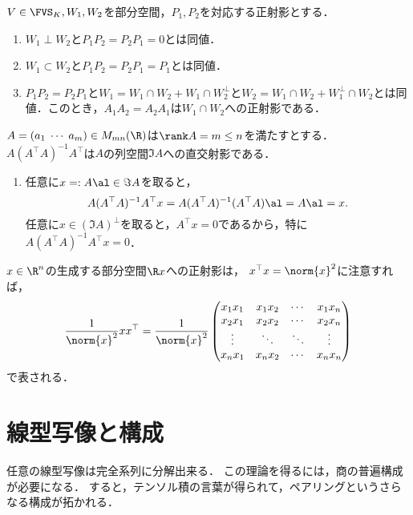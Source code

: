\documentclass[uplatex, dvipdfmx]{jsreport}
\begin{document}
\begin{proposition}[部分空間の演算の正射影の演算への対応]
    $V\in\FVS_K,W_1,W_2$を部分空間，$P_1,P_2$を対応する正射影とする．
    \begin{enumerate}
        \item $W_1\perp W_2$と$P_1P_2=P_2P_1=0$とは同値．
        \item $W_1\subset W_2$と$P_1P_2=P_2P_1=P_1$とは同値．
        \item $P_1P_2=P_2P_1$と$W_1=W_1\cap W_2+W_1\cap W_2^\perp$と$W_2=W_1\cap W_2+W_1^\perp\cap W_2$とは同値．このとき，$A_1A_2=A_2A_1$は$W_1\cap W_2$への正射影である．
    \end{enumerate}
\end{proposition}

\begin{proposition}[直交射影行列の表示]
    $A=(a_1\;\cdots\;a_m)\in M_{mn}(\R)$は$\rank A=m\le n$を満たすとする．
    $A(A^\top A)^{-1}A^\top$は$A$の列空間$\Im A$への直交射影である．
\end{proposition}
\begin{Proof}\mbox{}
    \begin{enumerate}
        \item 任意に$x=:A\al\in\Im A$を取ると，
        \[A(A^\top A)^{-1}A^\top x=A(A^\top A)^{-1}(A^\top A)\al=A\al=x.\]
        任意に$x\in(\Im A)^\perp$を取ると，$A^\top x=0$であるから，特に$A(A^\top A)^{-1}A^\top x=0$．
    \end{enumerate}
\end{Proof}

\begin{example}[直線への正射影を表す行列]
    $x\in\R^n$の生成する部分空間$\R x$への正射影は，
    $x^\top x=\norm{x}^2$に注意すれば，
    \[\frac{1}{\norm{x}^2}xx^\top=\frac{1}{\norm{x}^2}\begin{pmatrix}x_1x_1&x_1x_2&\cdots&x_1x_n\\x_2x_1&x_2x_2&\cdots&x_2x_n\\\vdots&\ddots&\ddots&\vdots\\x_nx_1&x_nx_2&\cdots&x_nx_n\end{pmatrix}\]
    で表される．
\end{example}

\section{線型写像と構成}

\begin{tcolorbox}[colframe=ForestGreen, colback=ForestGreen!10!white,breakable,colbacktitle=ForestGreen!40!white,coltitle=black,fonttitle=\bfseries\sffamily,
title=]
    任意の線型写像は完全系列に分解出来る．
    この理論を得るには，商の普遍構成が必要になる．
    すると，テンソル積の言葉が得られて，ペアリングというさらなる構成が拓かれる．
\end{tcolorbox}
\end{document}
